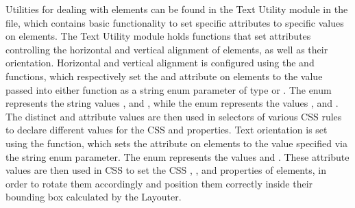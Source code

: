 Utilities for dealing with  elements can be found in the
Text Utility module in the  file, which contains
basic functionality to set specific  attributes to
specific values on  elements. The Text Utility module
holds functions that set  attributes controlling the
horizontal and vertical alignment of  elements, as well
as their orientation. Horizontal and vertical alignment is configured
using the  and 
functions, which respectively set the  and
 attribute on  elements to the value
passed into either function as a string enum parameter of type
 or . The
 enum represents the string values
,  and , while the
 enum represents the values ,
 and . The distinct
 and  attribute values are then
used in selectors of various CSS rules to declare different values for
the CSS  and  properties. Text
orientation is set using the  function, which
sets the  attribute on  elements
to the value specified via the  string enum
parameter. The  enum represents the values
 and . These
 attribute values are then used in CSS to set
the CSS , , and 
properties of  elements, in order to rotate them
accordingly and position them correctly inside their bounding box
calculated by the Layouter.


